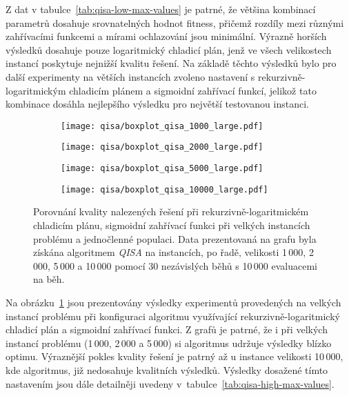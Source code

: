 Z dat v tabulce~\ref{tab:qisa-low-max-values} je patrné, že většina kombinací parametrů dosahuje srovnatelných hodnot fitness, přičemž rozdíly mezi různými zahřívacími funkcemi a mírami ochlazování jsou minimální. 
Výrazně horších výsledků dosahuje pouze logaritmický chladicí plán, jenž ve všech velikostech instancí poskytuje nejnižší kvalitu řešení. 
Na základě těchto výsledků bylo pro další experimenty na větších instancích zvoleno nastavení s rekurzivně-logaritmickým chladicím plánem a sigmoidní zahřívací funkcí, jelikož tato kombinace dosáhla nejlepšího výsledku pro největší testovanou instanci.

\begin{figure}[ht!]
    \centering
    \begin{subfigure}[b]{0.24\textwidth}
      \texttt{[image: qisa/boxplot\_qisa\_1000\_large.pdf]}
    \end{subfigure}
    \hfill
    \begin{subfigure}[b]{0.24\textwidth}
        \texttt{[image: qisa/boxplot\_qisa\_2000\_large.pdf]}
    \end{subfigure}
    \hfill
    \begin{subfigure}[b]{0.24\textwidth}
        \texttt{[image: qisa/boxplot\_qisa\_5000\_large.pdf]}
    \end{subfigure}
    \hfill
    \begin{subfigure}[b]{0.24\textwidth}
        \texttt{[image: qisa/boxplot\_qisa\_10000\_large.pdf]}
    \end{subfigure}
    \caption{Porovnání kvality nalezených řešení při rekurzivně-logaritmickém chladicím plánu, sigmoidní zahřívací funkci při velkých instancích problému a jednočlenné populaci. Data prezentovaná na grafu byla získána algoritmem \emph{QISA} na instancích, po řadě, velikosti 1\,000, 2\,000, 5\,000 a 10\,000 pomocí 30 nezávislých běhů s 10\,000 evaluacemi na běh.}
    \label{fig:qisa-large}
\end{figure}

Na obrázku~\ref{fig:qisa-large} jsou prezentovány výsledky experimentů provedených na velkých instancí problému při konfiguraci algoritmu využívající rekurzivně-logaritmický chladicí plán a sigmoidní zahřívací funkci. 
Z grafů je patrné, že i při velkých instancí problému (1\,000, 2\,000 a 5\,000) si algoritmus udržuje výsledky blízko optimu. 
Výraznější pokles kvality řešení je patrný až u instance velikosti 10\,000, kde algoritmus, již nedosahuje kvalitních výsledků. 
Výsledky dosažené tímto nastavením jsou dále detailněji uvedeny v~tabulce~\ref{tab:qisa-high-max-values}. 

